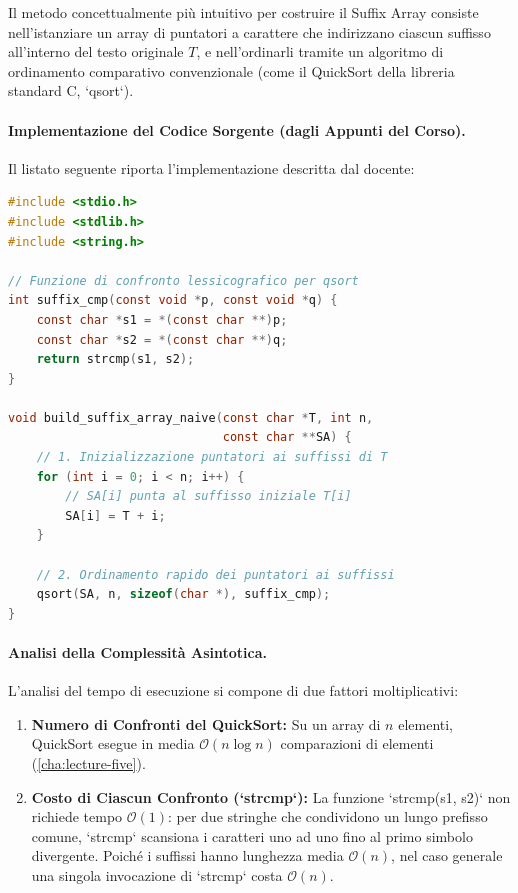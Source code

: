Il metodo concettualmente pi\`u intuitivo per costruire il Suffix Array consiste nell'istanziare un array di puntatori a carattere che indirizzano ciascun suffisso all'interno del testo originale $T$, e nell'ordinarli tramite un algoritmo di ordinamento comparativo convenzionale (come il QuickSort della libreria standard C, `qsort`).

\paragraph{Implementazione del Codice Sorgente (dagli Appunti del Corso).}
Il listato seguente riporta l'implementazione descritta dal docente:

\begin{lstlisting}[language=C, caption={Costruzione ingenua del Suffix Array tramite puntatori e QuickSort standard.}, label={lst:naive-sa-c}]
#include <stdio.h>
#include <stdlib.h>
#include <string.h>

// Funzione di confronto lessicografico per qsort
int suffix_cmp(const void *p, const void *q) {
    const char *s1 = *(const char **)p;
    const char *s2 = *(const char **)q;
    return strcmp(s1, s2);
}

void build_suffix_array_naive(const char *T, int n,
                              const char **SA) {
    // 1. Inizializzazione puntatori ai suffissi di T
    for (int i = 0; i < n; i++) {
        // SA[i] punta al suffisso iniziale T[i]
        SA[i] = T + i;
    }

    // 2. Ordinamento rapido dei puntatori ai suffissi
    qsort(SA, n, sizeof(char *), suffix_cmp);
}
\end{lstlisting}

\paragraph{Analisi della Complessit\`a Asintotica.}
L'analisi del tempo di esecuzione si compone di due fattori moltiplicativi:
\begin{enumerate}
  \item \textbf{Numero di Confronti del QuickSort:} Su un array di $n$ elementi, QuickSort esegue in media $\mathcal{O}(n \log n)$ comparazioni di elementi (\autoref{cha:lecture-five}).
  \item \textbf{Costo di Ciascun Confronto (`strcmp`):} La funzione `strcmp(s1, s2)` non richiede tempo $\mathcal{O}(1)$: per due stringhe che condividono un lungo prefisso comune, `strcmp` scansiona i caratteri uno ad uno fino al primo simbolo divergente. Poich\'e i suffissi hanno lunghezza media $\mathcal{O}(n)$, nel caso generale una singola invocazione di `strcmp` costa $\mathcal{O}(n)$.
\end{enumerate}

